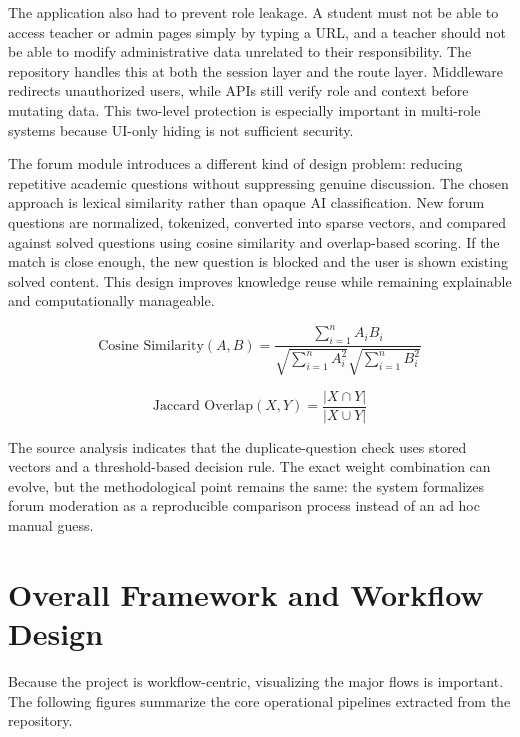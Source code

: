 \documentclass[12pt,a4paper]{report}
\begin{document}
The application also had to prevent role leakage. A student must not be able to access teacher or admin pages simply by typing a URL, and a teacher should not be able to modify administrative data unrelated to their responsibility. The repository handles this at both the session layer and the route layer. Middleware redirects unauthorized users, while APIs still verify role and context before mutating data. This two-level protection is especially important in multi-role systems because UI-only hiding is not sufficient security.

The forum module introduces a different kind of design problem: reducing repetitive academic questions without suppressing genuine discussion. The chosen approach is lexical similarity rather than opaque AI classification. New forum questions are normalized, tokenized, converted into sparse vectors, and compared against solved questions using cosine similarity and overlap-based scoring. If the match is close enough, the new question is blocked and the user is shown existing solved content. This design improves knowledge reuse while remaining explainable and computationally manageable.

\begin{equation}
\text{Cosine Similarity}(A, B) =
\frac{\sum_{i=1}^{n} A_i B_i}
{\sqrt{\sum_{i=1}^{n} A_i^2}\sqrt{\sum_{i=1}^{n} B_i^2}}
\end{equation}

\begin{equation}
\text{Jaccard Overlap}(X, Y) =
\frac{|X \cap Y|}{|X \cup Y|}
\end{equation}

The source analysis indicates that the duplicate-question check uses stored vectors and a threshold-based decision rule. The exact weight combination can evolve, but the methodological point remains the same: the system formalizes forum moderation as a reproducible comparison process instead of an ad hoc manual guess.

\section{Overall Framework and Workflow Design}
Because the project is workflow-centric, visualizing the major flows is important. The following figures summarize the core operational pipelines extracted from the repository.
\end{document}
